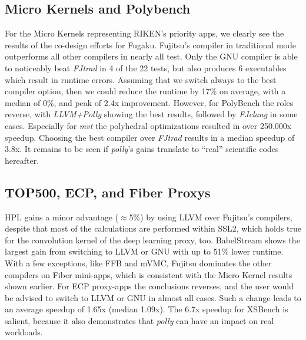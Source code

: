 \documentclass[conference,compsoc]{IEEEtran}
\begin{document}
\subsection{Micro Kernels and Polybench}\label{sec:eval:micro}
For the Micro Kernels representing RIKEN's priority apps, we clearly see the results
of the co-design efforts for Fugaku. Fujitsu's compiler in traditional mode outperforms
all other compilers in nearly all test. Only the GNU compiler is able to noticeably beat \textit{FJtrad}
in 4 of the 22 tests, but also produces 6 executables which result in runtime errors.
Assuming that we switch always to the best compiler option, then we could reduce the runtime by 17\% on
average, with a median of 0\%, and peak of 2.4x improvement.
However, for PolyBench the roles reverse, with \textit{LLVM+Polly} showing the best results,
followed by \textit{FJclang} in some cases. Especially for \textit{mvt} the polyhedral optimizations
resulted in over 250.000x speedup. Choosing the best compiler over \textit{FJtrad} results in
a median speedup of 3.8x. It remains to be seen if \textit{polly}'s gains translate to
``real'' scientific codes hereafter.

\subsection{TOP500, ECP, and Fiber Proxys}\label{sec:eval:proxy}
HPL gains a minor advantage ($\approx$5\%) by using LLVM over Fujitsu's compilers, despite that
most of the calculations are performed within SSL2, which holds true for the convolution kernel
of the deep learning proxy, too. BabelStream shows the largest gain from switching to LLVM or GNU
with up to 51\% lower runtime. With a few exceptions, like FFB and mVMC, Fujitsu dominates the
other compilers on Fiber mini-apps, which is consistent with the Micro Kernel results shown earlier.
For ECP proxy-apps the conclusions reverses, and the user would be advised to switch to LLVM or
GNU in almost all cases. Such a change leads to an average speedup of 1.65x (median 1.09x).
The 6.7x speedup for XSBench is salient, because it also demonstrates that \textit{polly}
can have an impact on real workloads.
\end{document}
